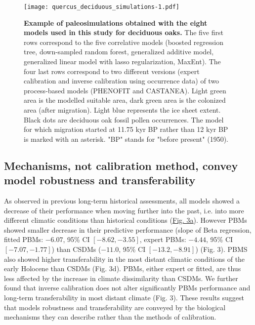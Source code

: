 \documentclass[pdflatex, sn-nature]{sn-jnl}%
\begin{document}
\begin{figure}
\centering
\vspace*{-0.6in}
\hspace*{-0.35in}
\texttt{[image: quercus\_deciduous\_simulations-1.pdf]}
\begin{adjustwidth}{-0.5cm}{-0.5cm}
\caption{\textbf{Example of paleosimulations obtained with the eight models used in this study for deciduous oaks.} The five first rows correspond to the five correlative models (boosted regression tree, down-sampled random forest, generalized additive model, generalized linear model with lasso regularization, MaxEnt). The four last rows correspond to two different versions (expert calibration and inverse calibration using occurrence data) of two process-based models (PHENOFIT and CASTANEA). Light green area is the modelled suitable area, dark green area is the colonized area (after migration). Light blue represents the ice sheet extent. Black dots are deciduous oak fossil pollen occurrences. The model for which migration started at 11.75 kyr BP rather than 12 kyr BP is marked with an asterisk. "BP" stands for "before present" (1950).}\label{quercus_migration}
\end{adjustwidth}
\end{figure}

\subsection{Mechanisms, not calibration method, convey model robustness and transferability }

As observed in previous long-term historical assessments, all models showed a decrease of their performance when moving further into the past, i.e. into more different climatic conditions than historical conditions (\hyperref[past_performance]{Fig. 3a}).
However PBMs showed smaller decrease in their predictive performance (slope of Beta regression, fitted PBMs: $-6.07$, 95\% CI $[-8.62, -3.55]$, expert PBMs: $-4.44$, 95\% CI $[-7.07, -1.77]$) than CSDMs ($-11.0$, 95\% CI $[-13.2, -8.91]$) (Fig. 3). PBMS also showed higher transferability in the most distant climatic conditions of the early Holocene than CSDMs (Fig. 3d). PBMs, either expert or fitted, are thus less affected by the increase in climate dissimilarity than CSDMs.  We further found that inverse calibration does not alter significantly PBMs performance and long-term transferability in most distant climate (Fig. 3).  These results suggest that models robustness and transferability are conveyed by the biological mechanisms they can describe rather than the methods of calibration.
\end{document}

